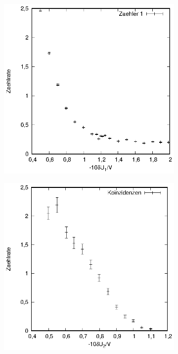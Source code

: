 \begin{figure}[h]
\begin{subfigure}[h]{0.5\textwidth}
    \includegraphics[width=\textwidth]{data/schwelle_1_zaehler.eps}
  \end{subfigure}
  \begin{subfigure}[h]{0.5\textwidth}
    \centering
    \includegraphics[width=\textwidth]{data/schwelle_2_koinzidenz.eps}

\end{subfigure}
\end{figure}
